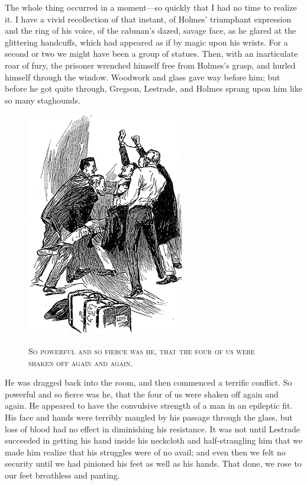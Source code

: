 \documentclass[12pt,english,oneside]{book}
\newcommand{\noun}[1]{\textsc{#1}}
\newcommand{\mdsh}[1]{\mbox{#1}\linebreak[1]}
\begin{document}
The whole thing occurred in a moment\mdsh{---}so quickly that I had
no time to realize it. I have a vivid recollection of that instant,
of Holmes' triumphant expression and the ring of his voice, of the
cabman's dazed, savage face, as he glared at the glittering handcuffs,
which had appeared as if by magic upon his wrists. For a second or
two we might have been a group of statues. Then, with an inarticulate
roar of fury, the prisoner wrenched himself free from Holmes's grasp,
and hurled himself through the window. Woodwork and glass gave way
before him; but before he got quite through, Gregson, Lestrade, and
Holmes sprang upon him like so many staghounds. %
\begin{figure}[htbp]
\noindent \begin{center}\includegraphics{images/study10-stud-13.png}\end{center}

\noindent \begin{center}\noun{So powerful and so fierce was he,
that the four of us were shaken off again and again.}\end{center}
\end{figure}
He was dragged back into the room, and then commenced a terrific conflict.
So powerful and so fierce was he, that the four of us were shaken
off again and again. He appeared to have the convulsive strength of
a man in an epileptic fit. His face and hands were terribly mangled
by his passage through the glass, but loss of blood had no effect
in diminishing his resistance. It was not until Lestrade succeeded
in getting his hand inside his neckcloth and half-strangling him that
we made him realize that his struggles were of no avail; and even
then we felt no security until we had pinioned his feet as well as
his hands. That done, we rose to our feet breathless and panting.
\end{document}
